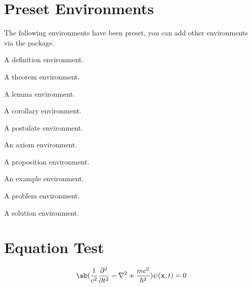 \section{Preset Environments}
The following environments have been preset, you can add other environments via the  package.

\begin{multicols}{2}

\begin{definition}
    A definition environment.
\end{definition}

\begin{theorem}
    A theorem environment.
\end{theorem}

\begin{lemma}
    A lemma environment.
\end{lemma}

\begin{corollary}
    A corollary environment.
\end{corollary}

\begin{postulate}
    A postulate environment.
\end{postulate}

\begin{axiom}
    An axiom environment.
\end{axiom}

\begin{proposition}
    A proposition environment.
\end{proposition}

\begin{example}
    An example environment.
\end{example}

\begin{problem}
    A problem environment.
\end{problem}

\begin{solution}
    A solution environment.
\end{solution}

\end{multicols}

\section{Equation Test}
\begin{equation}
    \ab(\frac1{c^2}\frac{\partial^2}{\partial t^2}-\nabla^2+\frac{mc^2}{\hbar^2})\psi(\mathbf x,t)=0
    \label{1.6.1}
\end{equation}

